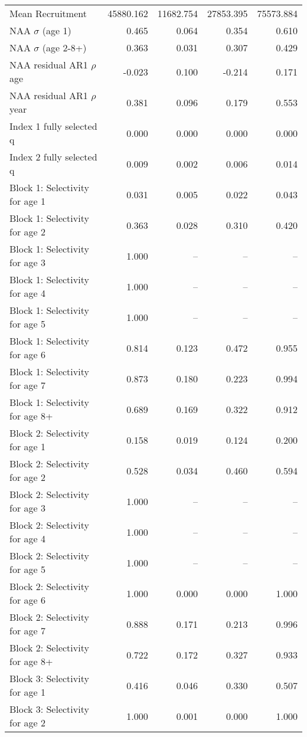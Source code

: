 \documentclass[
]{article}
\begin{document}
\begin{landscape}
\begin{longtable}[t]{lrrrr}
\endfoot
\bottomrule
\endlastfoot
Mean Recruitment & 45880.162 & 11682.754 & 27853.395 & 75573.884\\
NAA $\sigma$ (age 1) & 0.465 & 0.064 & 0.354 & 0.610\\
NAA $\sigma$ (age 2-8+) & 0.363 & 0.031 & 0.307 & 0.429\\
NAA residual AR1 $\rho$ age & -0.023 & 0.100 & -0.214 & 0.171\\
NAA residual AR1 $\rho$ year & 0.381 & 0.096 & 0.179 & 0.553\\
\addlinespace
Index 1 fully selected q & 0.000 & 0.000 & 0.000 & 0.000\\
Index 2 fully selected q & 0.009 & 0.002 & 0.006 & 0.014\\
Block 1: Selectivity for age 1 & 0.031 & 0.005 & 0.022 & 0.043\\
Block 1: Selectivity for age 2 & 0.363 & 0.028 & 0.310 & 0.420\\
Block 1: Selectivity for age 3 & 1.000 & -- & -- & --\\
\addlinespace
Block 1: Selectivity for age 4 & 1.000 & -- & -- & --\\
Block 1: Selectivity for age 5 & 1.000 & -- & -- & --\\
Block 1: Selectivity for age 6 & 0.814 & 0.123 & 0.472 & 0.955\\
Block 1: Selectivity for age 7 & 0.873 & 0.180 & 0.223 & 0.994\\
Block 1: Selectivity for age 8+ & 0.689 & 0.169 & 0.322 & 0.912\\
\addlinespace
Block 2: Selectivity for age 1 & 0.158 & 0.019 & 0.124 & 0.200\\
Block 2: Selectivity for age 2 & 0.528 & 0.034 & 0.460 & 0.594\\
Block 2: Selectivity for age 3 & 1.000 & -- & -- & --\\
Block 2: Selectivity for age 4 & 1.000 & -- & -- & --\\
Block 2: Selectivity for age 5 & 1.000 & -- & -- & --\\
\addlinespace
Block 2: Selectivity for age 6 & 1.000 & 0.000 & 0.000 & 1.000\\
Block 2: Selectivity for age 7 & 0.888 & 0.171 & 0.213 & 0.996\\
Block 2: Selectivity for age 8+ & 0.722 & 0.172 & 0.327 & 0.933\\
Block 3: Selectivity for age 1 & 0.416 & 0.046 & 0.330 & 0.507\\
Block 3: Selectivity for age 2 & 1.000 & 0.001 & 0.000 & 1.000\\

\end{longtable}
\end{landscape}
\end{document}
